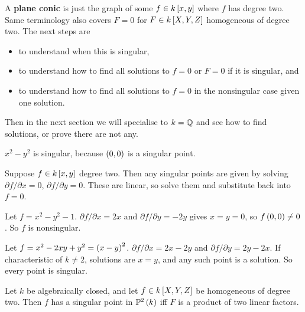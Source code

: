
A \textbf{plane conic} is just the graph of some $ f \in k\sb{x, y} $ where $ f $ has degree two. Same terminology also covers $ F = 0 $ for $ F \in k\sb{X, Y, Z} $ homogeneous of degree two. The next steps are
\begin{itemize}
\item to understand when this is singular,
\item to understand how to find all solutions to $ f = 0 $ or $ F = 0 $ if it is singular, and
\item to understand how to find all solutions to $ f = 0 $ in the nonsingular case given one solution.
\end{itemize}
Then in the next section we will specialise to $ k = \Q $ and see how to find solutions, or prove there are not any.

\begin{example*}
$ x^2 - y^2 $ is singular, because $ \rb{0, 0} $ is a singular point.
\end{example*}

\begin{algorithm}[Checking if $ f = 0 $ is singular]
Suppose $ f \in k\sb{x, y} $ degree two. Then any singular points are given by solving $ \partial f / \partial x = 0 $, $ \partial f / \partial y = 0 $. These are linear, so solve them and substitute back into $ f = 0 $.
\end{algorithm}

\begin{example*}
Let $ f = x^2 - y^2 - 1 $. $ \partial f / \partial x = 2x $ and $ \partial f / \partial y = -2y $ gives $ x = y = 0 $, so $ f\rb{0, 0} \ne 0 $. So $ f $ is nonsingular.
\end{example*}

\begin{example*}
Let $ f = x^2 - 2xy + y^2 = \rb{x - y}^2 $. $ \partial f / \partial x = 2x - 2y $ and $ \partial f / \partial y = 2y - 2x $. If characteristic of $ k \ne 2 $, solutions are $ x = y $, and any such point is a solution. So every point is singular.
\end{example*}

\begin{theorem}
Let $ k $ be algebraically closed, and let $ f \in k\sb{X, Y, Z} $ be homogeneous of degree two. Then $ f $ has a singular point in $ \P^2\rb{k} $ iff $ F $ is a product of two linear factors.
\end{theorem}

